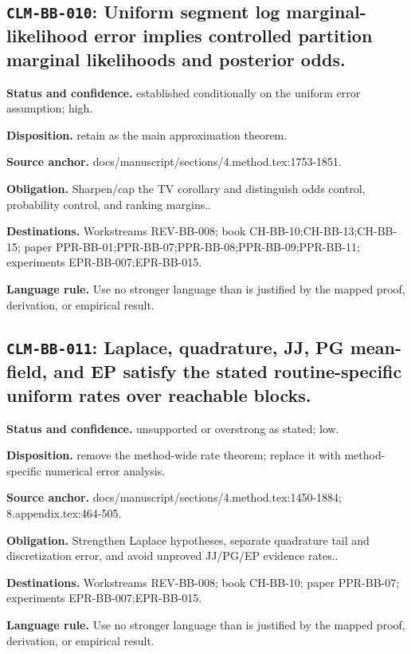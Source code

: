 \subsection[\texttt{CLM-BB-010}]{\texttt{CLM-BB-010}: Uniform segment log marginal-likelihood error implies controlled partition marginal likelihoods and posterior odds.}
\textbf{Status and confidence.} established conditionally on the uniform error assumption; high.\par
\textbf{Disposition.} retain as the main approximation theorem.\par
\textbf{Source anchor.} docs/manuscript/sections/4.method.tex:1753-1851.\par
\textbf{Obligation.} Sharpen/cap the TV corollary and distinguish odds control, probability control, and ranking margins..\par
\textbf{Destinations.} Workstreams REV-BB-008; book CH-BB-10;CH-BB-13;CH-BB-15; paper PPR-BB-01;PPR-BB-07;PPR-BB-08;PPR-BB-09;PPR-BB-11; experiments EPR-BB-007;EPR-BB-015.\par
\textbf{Language rule.} Use no stronger language than is justified by the mapped proof, derivation, or empirical result.

\subsection[\texttt{CLM-BB-011}]{\texttt{CLM-BB-011}: Laplace, quadrature, JJ, PG mean-field, and EP satisfy the stated routine-specific uniform rates over reachable blocks.}
\textbf{Status and confidence.} unsupported or overstrong as stated; low.\par
\textbf{Disposition.} remove the method-wide rate theorem; replace it with method-specific numerical error analysis.\par
\textbf{Source anchor.} docs/manuscript/sections/4.method.tex:1450-1884; 8.appendix.tex:464-505.\par
\textbf{Obligation.} Strengthen Laplace hypotheses, separate quadrature tail and discretization error, and avoid unproved JJ/PG/EP evidence rates..\par
\textbf{Destinations.} Workstreams REV-BB-008; book CH-BB-10; paper PPR-BB-07; experiments EPR-BB-007;EPR-BB-015.\par
\textbf{Language rule.} Use no stronger language than is justified by the mapped proof, derivation, or empirical result.

